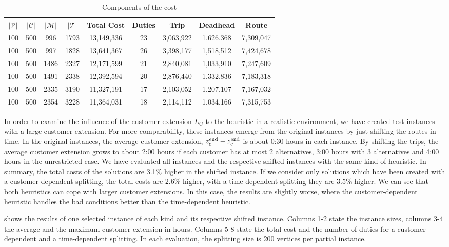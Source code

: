 \begin{table}[htb]
	\centering
	\begin{tabular}{ccccccccc}
		\toprule
		$\vert\mathcal{V}\vert$ & $\vert\mathcal{C}\vert$ & $\vert\mathcal{M}\vert$ & $\vert\mathcal{T}\vert$ & Total Cost & Duties & Trip & Deadhead & Route \\
		\midrule
		100 & 500 &  996 & 1793 & 13,149,336 & 23 & 3,063,922 & 1,626,368 & 7,309,047 \\
		100 & 500 &  997 & 1828 & 13,641,367 & 26 & 3,398,177 & 1,518,512 & 7,424,678 \\
		100 & 500 & 1486 & 2327 & 12,171,599 & 21 & 2,840,081 & 1,033,910 & 7,247,609 \\
		100 & 500 & 1491 & 2338 & 12,392,594 & 20 & 2,876,440 & 1,332,836 & 7,183,318 \\
		100 & 500 & 2335 & 3190 & 11,327,191 & 17 & 2,103,052 & 1,207,107 & 7,167,032 \\
		100 & 500 & 2354 & 3228 & 11,364,031 & 18 & 2,114,112 & 1,034,166 & 7,315,753 \\
		\bottomrule
	\end{tabular}
	\caption{Components of the cost}
	\label{tab:results:general}
\end{table}

In order to examine the influence of the customer extension $L_{\operatorname{C}}$ to the heuristic in a realistic environment, we have created test instances with a large customer extension. For more comparability, these instances emerge from the original instances by just shifting the routes in time. In the original instances, the average customer extension, \ie ${z^{\operatorname{end}}_c - z^{\operatorname{end}}_c}$ is about 0:30 hours in each instance. By shifting the trips, the average customer extension grows to about 2:00 hours if each customer has at most 2 alternatives, 3:00 hours with 3 alternatives and 4:00 hours in the unrestricted case. We have evaluated all instances and the respective shifted instances with the same kind of heuristic. In summary, the total costs of the solutions are 3.1\% higher in the shifted instance. If we consider only solutions which have been created with a customer-dependent splitting, the total costs are 2.6\% higher, with a time-dependent splitting they are 3.5\% higher. We can see that both heuristics can cope with larger customer extensions. In this case, the results are slightly worse, where the customer-dependent heuristic handles the bad conditions better than the time-dependent heuristic.

 shows the results of one selected instance of each kind and its respective shifted instance. Columns 1-2 state the instance sizes, columns 3-4 the average and the maximum customer extension in hours. Columns 5-8 state the total cost and the number of duties for a customer-dependent and a time-dependent splitting. In each evaluation, the splitting size is 200 vertices per partial instance.

